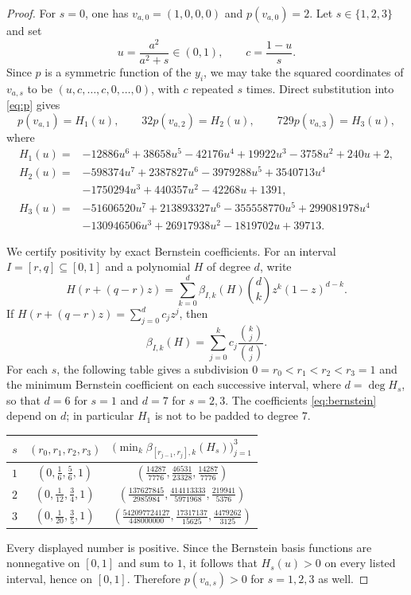 \documentclass[11pt]{amsart}
\theoremstyle{remark}
\begin{document}
\begin{proof}
For $s=0$, one has $v_{a,0}=(1,0,0,0)$ and $p(v_{a,0})=2$.
Let $s\in\{1,2,3\}$ and set
\[
u=\frac{a^2}{a^2+s}\in(0,1),
\qquad
c=\frac{1-u}{s}.
\]
Since $p$ is a symmetric function of the $y_i$, we may take the squared
coordinates of $v_{a,s}$ to be
$(u,c,\ldots,c,0,\ldots,0)$, with $c$ repeated $s$ times. Direct
substitution into \eqref{eq:p} gives
\[
p(v_{a,1})=H_1(u),\qquad
32p(v_{a,2})=H_2(u),\qquad
729p(v_{a,3})=H_3(u),
\]
where
\begin{align*}
H_1(u)={}&
-12886u^6+38658u^5-42176u^4+19922u^3
-3758u^2+240u+2,\\
H_2(u)={}&
-598374u^7+2387827u^6-3979288u^5+3540713u^4\\
&-1750294u^3+440357u^2-42268u+1391,\\
H_3(u)={}&
-51606520u^7+213893327u^6-355558770u^5+299081978u^4\\
&-130946506u^3+26917938u^2-1819702u+39713.
\end{align*}

We certify positivity by exact Bernstein coefficients. For an interval
$I=[r,q]\subseteq[0,1]$ and a polynomial $H$ of degree $d$, write
\[
H(r+(q-r)z)
=
\sum_{k=0}^{d}\beta_{I,k}(H)
\binom{d}{k}z^k(1-z)^{d-k}.
\]
If $H(r+(q-r)z)=\sum_{j=0}^{d}c_jz^j$, then
\begin{equation}\label{eq:bernstein}
\beta_{I,k}(H)
=
\sum_{j=0}^{k}c_j
\frac{\binom{k}{j}}{\binom{d}{j}}.
\end{equation}
For each $s$, the following table gives a subdivision
$0=r_0<r_1<r_2<r_3=1$ and the minimum Bernstein coefficient on each
successive interval, where $d=\deg H_s$, so that $d=6$ for $s=1$ and
$d=7$ for $s=2,3$. The coefficients \eqref{eq:bernstein} depend on $d$;
in particular $H_1$ is not to be padded to degree $7$.

\begin{center}
\small
\renewcommand{\arraystretch}{1.35}
\begin{tabular}{@{}c c c@{}}
\toprule
$s$ & $(r_0,r_1,r_2,r_3)$
& $\bigl(\min_k\beta_{[r_{j-1},r_j],k}(H_s)\bigr)_{j=1}^{3}$ \\
\midrule
$1$ & $\left(0,\frac16,\frac56,1\right)$
& $\left(\frac{14287}{7776},\frac{46531}{23328},
          \frac{14287}{7776}\right)$ \\[1.5ex]
$2$ & $\left(0,\frac1{12},\frac34,1\right)$
& $\left(\frac{137627845}{2985984},
          \frac{414113333}{5971968},\frac{219941}{5376}\right)$ \\[1.5ex]
$3$ & $\left(0,\frac1{20},\frac35,1\right)$
& $\left(\frac{542097724127}{448000000},
          \frac{17317137}{15625},\frac{4479262}{3125}\right)$ \\
\bottomrule
\end{tabular}
\end{center}

Every displayed number is positive. Since the Bernstein basis
functions are nonnegative on $[0,1]$ and sum to $1$, it follows that
$H_s(u)>0$ on every listed interval, hence on $[0,1]$. Therefore
$p(v_{a,s})>0$ for $s=1,2,3$ as well.
\end{proof}
\end{document}
